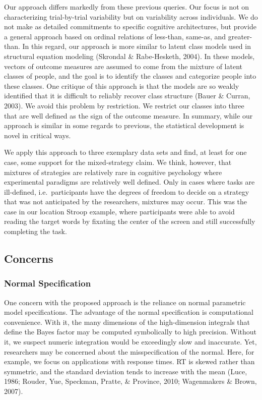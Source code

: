 \documentclass[english,man]{apa6}
\theoremstyle{definition}
\theoremstyle{definition}
\theoremstyle{remark}
\begin{document}
Our approach differs markedly from these previous queries. Our focus is
not on characterizing trial-by-trial variability but on variability
across individuals. We do not make as detailed commitments to specific
cognitive architectures, but provide a general approach based on ordinal
relations of less-than, same-as, and greater-than. In this regard, our
approach is more similar to latent class models used in structural
equation modeling (Skrondal \& Rabe-Hesketh, 2004). In these models,
vectors of outcome measures are assumed to come from the mixture of
latent classes of people, and the goal is to identify the classes and
categorize people into these classes. One critique of this approach is
that the models are so weakly identified that it is difficult to
reliably recover class structure (Bauer \& Curran, 2003). We avoid this
problem by restriction. We restrict our classes into three that are well
defined as the sign of the outcome measure. In summary, while our
approach is similar in some regards to previous, the statistical
development is novel in critical ways.

We apply this approach to three exemplary data sets and find, at least
for one case, some support for the mixed-strategy claim. We think,
however, that mixtures of strategies are relatively rare in cognitive
psychology where experimental paradigms are relatively well defined.
Only in cases where tasks are ill-defined, i.e.~participants have the
degrees of freedom to decide on a strategy that was not anticipated by
the researchers, mixtures may occur. This was the case in our location
Stroop example, where participants were able to avoid reading the target
words by fixating the center of the screen and still successfully
completing the task.

\subsection{Concerns}\label{concerns}

\subsubsection{Normal Specification}\label{normal-specification}

One concern with the proposed approach is the reliance on normal
parametric model specifications. The advantage of the normal
specification is computational convenience. With it, the many dimensions
of the high-dimension integrals that define the Bayes factor may be
computed symbolically to high precision. Without it, we suspect numeric
integration would be exceedingly slow and inaccurate. Yet, researchers
may be concerned about the misspecification of the normal. Here, for
example, we focus on applications with response times. RT is skewed
rather than symmetric, and the standard deviation tends to increase with
the mean (Luce, 1986; Rouder, Yue, Speckman, Pratte, \& Province, 2010;
Wagenmakers \& Brown, 2007).
\end{document}
